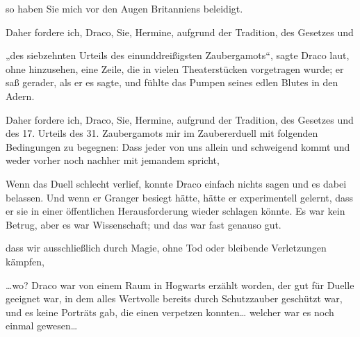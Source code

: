 \begin{writtenNote}
so haben Sie mich vor den Augen Britanniens beleidigt.

Daher fordere ich, Draco, Sie, Hermine, aufgrund der Tradition, des Gesetzes und
\end{writtenNote}

„des siebzehnten Urteils des einunddreißigsten Zaubergamots“, sagte Draco laut, ohne hinzusehen, eine Zeile, die in vielen Theaterstücken vorgetragen wurde; er saß gerader, als er es sagte, und fühlte das Pumpen seines edlen Blutes in den Adern.

\begin{writtenNote}
Daher fordere ich, Draco, Sie, Hermine, aufgrund der Tradition, des Gesetzes und des 17. Urteils des 31. Zaubergamots mir im Zaubererduell mit folgenden Bedingungen zu begegnen: Dass jeder von uns allein und schweigend kommt und weder vorher noch nachher mit jemandem spricht,
\end{writtenNote}

Wenn das Duell schlecht verlief, konnte Draco einfach nichts sagen und es dabei belassen. Und wenn er Granger besiegt hätte, hätte er experimentell gelernt, dass er sie in einer öffentlichen Herausforderung wieder schlagen könnte. Es war kein Betrug, aber es war Wissenschaft; und das war fast genauso gut.

\begin{writtenNote}
dass wir ausschließlich durch Magie, ohne Tod oder bleibende Verletzungen kämpfen,
\end{writtenNote}

…wo? Draco war von einem Raum in Hogwarts erzählt worden, der gut für Duelle geeignet war, in dem alles Wertvolle bereits durch Schutzzauber geschützt war, und es keine Porträts gab, die einen verpetzen konnten… welcher war es noch einmal gewesen…

